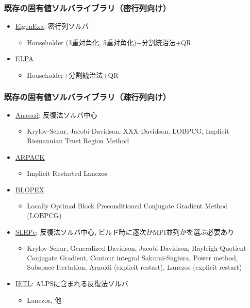 \begin{frame}
  \frametitle{既存の固有値ソルバライブラリ（密行列向け）}
  \begin{itemize}
  \item \href{http://www.aics.riken.jp/labs/lpnctrt/EigenExa.html}{EigenExa}: 密行列ソルバ
    \begin{itemize}
      \item Householder (3重対角化, 5重対角化)+分割統治法+QR
    \end{itemize}
  \item \href{http://elpa.rzg.mpg.de}{ELPA}
    \begin{itemize}
      \item Householder+分割統治法+QR
    \end{itemize}
  \end{itemize}
\end{frame}

\begin{frame}
  \frametitle{既存の固有値ソルバライブラリ（疎行列向け）}
  \begin{itemize}
  \item \href{http://trilinos.org/packages/anasazi/}{Anasazi}: 反復法ソルバ中心
    \begin{itemize}
      \item Krylov-Schur, Jacobi-Davidson, XXX-Davidson, LOBPCG, Implicit Riemannian Trust Region Method
    \end{itemize}
  \item \href{http://www.caam.rice.edu/software/ARPACK/}{ARPACK}
    \begin{itemize}
      \item Implicit Restarted Lanczos
    \end{itemize}
  \item \href{https://code.google.com/p/blopex/}{BLOPEX}
    \begin{itemize}
    \item Locally Optimal Block Preconditioned Conjugate Gradient Method (LOBPCG)
    \end{itemize}
  \item \href{http://www.grycap.upv.es/slepc/}{SLEPc}: 反復法ソルバ中心, ビルド時に逐次かMPI並列かを選ぶ必要あり
    \begin{itemize}
      \item Krylov-Schur, Generalized Davidson, Jacobi-Davidson, Rayleigh Quotient Conjugate Gradient, Contour integral Sakurai-Sugiura, Power method, Subspace Itertation, Arnoldi (explicit restart), Lanczos (explicit restart) \\
    \end{itemize}
  \item \href{http://www.comp-phys.org/software/ietl/}{IETL}: ALPSに含まれる反復法ソルバ
    \begin{itemize}
      \item Lanczos, 他
    \end{itemize}
  \end{itemize}
\end{frame}

